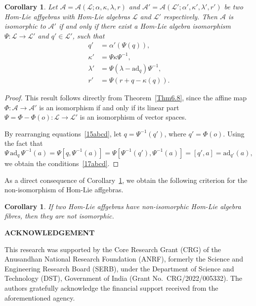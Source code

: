 \documentclass[14pt]{article}
\theoremstyle{Definition}
\newtheorem{Coro}[thm]{Corollary}
\theoremstyle{remark}
\begin{document}
\begin{Coro}\label{Coro6.9}
Let $\mathcal{A}=\mathcal{A}(\mathcal{L};\alpha,\kappa,\lambda,r)$ and  $\mathcal{A}'=\mathcal{A}(\mathcal{L}';\alpha',\kappa',\lambda',r')$ be two Hom-Lie affgebras with Hom-Lie algebras $\mathcal{L}$ and $\mathcal{L}'$ respectively. Then $\mathcal{A}$ is isomorphic to $\mathcal{A}'$ if and only if there exist a Hom-Lie algebra isomorphism $\Psi:\mathcal{L}\longrightarrow\mathcal{L}'$ and $q'\in \mathcal{L}'$, such that 
\begin{subequations}\label{17abcd}
\begin{align}
q'&=\alpha'(\Psi(q)),\label{17a}\\
\kappa' &=\Psi \kappa \Psi^{-1}, \label{17b}\\
\lambda' &= \Psi(\lambda-\mathrm{ad}_q)\Psi^{-1}, \label{17c}\\
r' &=\Psi( r + q-\kappa(q)). \label{17d}
\end{align}
\end{subequations}
\end{Coro}
\begin{proof}
This result follows directly from Theorem~\ref{Thm6.8}, since the affine map 
$\Phi:\mathcal{A}\rightarrow\mathcal{A}'$ is an isomorphism if and only if its linear part 
$\Psi = \Phi - \Phi(o) : \mathcal{L} \rightarrow \mathcal{L}'$ 
is an isomorphism of vector spaces. 

By rearranging equations~\eqref{15abcd}, let $q = \Psi^{-1}(q')$, where $q' = \Phi(o)$. 
Using the fact that 
\[
\Psi\,\mathrm{ad}_{q}\,\Psi^{-1}(a)
= \Psi[q, \Psi^{-1}(a)]
= \Psi[\Psi^{-1}(q'), \Psi^{-1}(a)]
= [q', a]
= \mathrm{ad}_{q'}(a),
\]
we obtain the conditions~\eqref{17abcd}.

\end{proof}
As a direct consequence of Corollary~\ref{Coro6.9}, we obtain the following criterion for the non-isomorphism of Hom-Lie affgebras.

\begin{Coro}
If two Hom-Lie affgebras have non-isomorphic Hom-Lie algebra fibres, then they are not isomorphic.
\end{Coro}

\begin{center}
 {\bf ACKNOWLEDGEMENT}
 \end{center}
 
This research was supported by the Core Research Grant (CRG) of the Anusandhan National Research Foundation (ANRF), formerly the Science and Engineering Research Board (SERB), under the Department of Science and Technology (DST), Government of India (Grant No.~CRG/2022/005332). The authors gratefully acknowledge the financial support received from the aforementioned agency.
\end{document}
